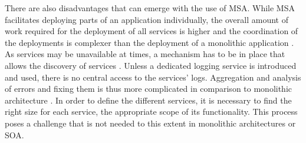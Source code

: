 There are also disadvantages that can emerge with the use of \ac{MSA}.
While \ac{MSA} facilitates deploying parts of an application individually, the overall amount of work required for the deployment of all services is higher and the coordination of the deployments is complexer than the deployment of a monolithic application \cite[p.~35]{Stubbs2015Distributed}.
As services may be unavailable at times, a mechanism has to be in place that allows the discovery of services \cite[p.~35]{Stubbs2015Distributed}.
Unless a dedicated logging service is introduced and used, there is no central access to the services' logs. Aggregation and analysis of errors and fixing them is thus more complicated in comparison to monolithic architecture \cite[p.~35]{Stubbs2015Distributed}.
In order to define the different services, it is necessary to find the right size for each service, \ie the appropriate scope of its functionality. This process poses a challenge that is not needed to this extent in monolithic architectures or \ac{SOA}.
